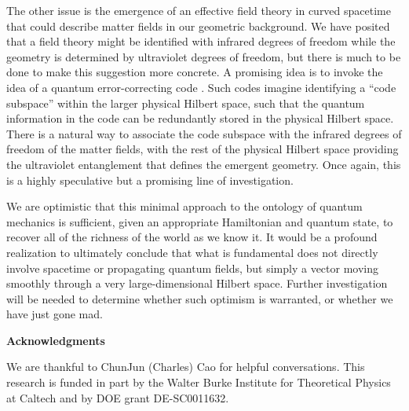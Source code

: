 \documentclass[12pt,english]{article}
\begin{document}
The other issue is the emergence of an effective field theory in curved spacetime that could describe matter fields in our geometric background.
We have posited that a field theory might be identified with infrared degrees of freedom while the geometry is determined by ultraviolet degrees of freedom, but there is much to be done to make this suggestion more concrete.
A promising idea is to invoke the idea of a quantum error-correcting code \cite{Harlow:2016vwg,Cao:2017hrv}.
Such codes imagine identifying a ``code subspace'' within the larger physical Hilbert space, such that the quantum information in the code can be redundantly stored in the physical Hilbert space.
There is a natural way to associate the code subspace with the infrared degrees of freedom of the matter fields, with the rest of the physical Hilbert space providing the ultraviolet entanglement that defines the emergent geometry.
Once again, this is a highly speculative but a promising line of investigation.

We are optimistic that this minimal approach to the ontology of quantum mechanics is sufficient, given an appropriate Hamiltonian and quantum state, to recover all of the richness of the world as we know it.
It would be a profound realization to ultimately conclude that what is fundamental does not directly involve spacetime or propagating quantum fields, but simply a vector moving smoothly through a very large-dimensional Hilbert space.
Further investigation will be needed to determine whether such optimism is warranted, or whether we have just gone mad.


\begin{center} 
 {\bf Acknowledgments}
 \end{center}

We are thankful to ChunJun (Charles) Cao for helpful conversations.
This research is funded in part by the Walter Burke Institute for Theoretical Physics at Caltech and by DOE grant DE-SC0011632.



\end{document}
